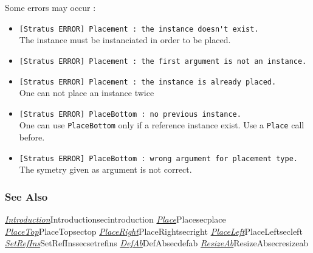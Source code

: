 Some errors may occur :    
\begin{itemize}
    \item \verb-[Stratus ERROR] Placement : the instance doesn't exist.-\\The instance must be instanciated in order to be placed.
    \item \verb-[Stratus ERROR] Placement : the first argument is not an instance.-
    \item \verb-[Stratus ERROR] Placement : the instance is already placed.-\\One can not place an instance twice    
    \item \verb-[Stratus ERROR] PlaceBottom : no previous instance.-\\One can use \verb-PlaceBottom- only if a reference instance exist. Use a \verb-Place- call before. 
    \item \verb-[Stratus ERROR] PlaceBottom : wrong argument for placement type.-\\The symetry given as argument is not correct.
\end{itemize}

\begin{htmlonly}

\subsubsection{See Also}

\hyperref[ref]{\emph{Introduction}}{}{Introduction}{secintroduction}
\hyperref[ref]{\emph{Place}}{}{Place}{secplace}
\hyperref[ref]{\emph{PlaceTop}}{}{PlaceTop}{sectop}
\hyperref[ref]{\emph{PlaceRight}}{}{PlaceRight}{secright}
\hyperref[ref]{\emph{PlaceLeft}}{}{PlaceLeft}{secleft}
\hyperref[ref]{\emph{SetRefIns}}{}{SetRefIns}{secsetrefins}
\hyperref[ref]{\emph{DefAb}}{}{DefAb}{secdefab}
\hyperref[ref]{\emph{ResizeAb}}{}{ResizeAb}{secresizeab}

\end{htmlonly}
